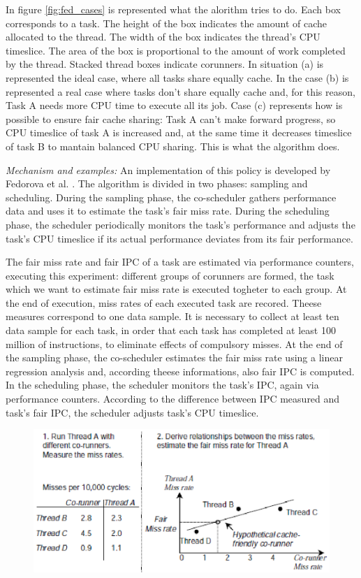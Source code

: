 \begin{description}
In figure \ref{fig:fed_cases} is represented what the alorithm tries to do. Each box corresponds to a task. The height of the box indicates the amount of
cache allocated to the thread. The width of the box indicates the thread's CPU timeslice. The area of the box is proportional to the amount of work 
completed by the thread. Stacked thread boxes indicate corunners. In situation (a) is represented the ideal case, where all tasks share equally 
cache. In the case (b) is represented a real case where tasks don't share equally cache and, for this reason, Task A needs more CPU time to execute
all its job. Case (c) represents how is possible to ensure fair cache sharing: Task A can't make forward progress, so CPU timeslice of task A is increased 
and, at the same time it decreases timeslice of task B to mantain balanced CPU sharing. This is what the algorithm does. 


\textit{Mechanism and examples:} An implementation of this policy is developed by Fedorova et al. \cite{fedorova}. The algorithm is divided in two phases: 
sampling and scheduling. During the sampling phase, the co-scheduler gathers performance data and uses it to estimate the task's fair miss rate. During the 
scheduling phase, the scheduler periodically monitors the task's performance and adjusts the task's CPU timeslice if its actual performance deviates from 
its fair performance.

The fair miss rate and fair IPC of a task are estimated via performance counters, executing this experiment: different groups of corunners are formed, 
the task which we want to estimate fair miss rate is executed togheter to each group. At the end of execution, miss rates of each executed task are 
recored. Theese measures correspond to one data sample. It is necessary to collect at least ten data sample for each task, in order that each task has 
completed at least 100 million of instructions, to eliminate effects of compulsory misses. At the end of the sampling phase, the co-scheduler estimates the 
fair miss rate using a linear regression analysis and, according theese informations, also fair IPC is computed. In the scheduling phase, the scheduler 
monitors the task's IPC, again via performance counters. According to the difference between IPC measured and task's fair IPC, the scheduler adjusts task's 
CPU timeslice.

\begin{figure}[htbp]
\centering
\includegraphics[width=\widefigure]{images/fedorova.eps}
\caption{}
\label{fig:fedorova}
\end{figure}



\end{description}
